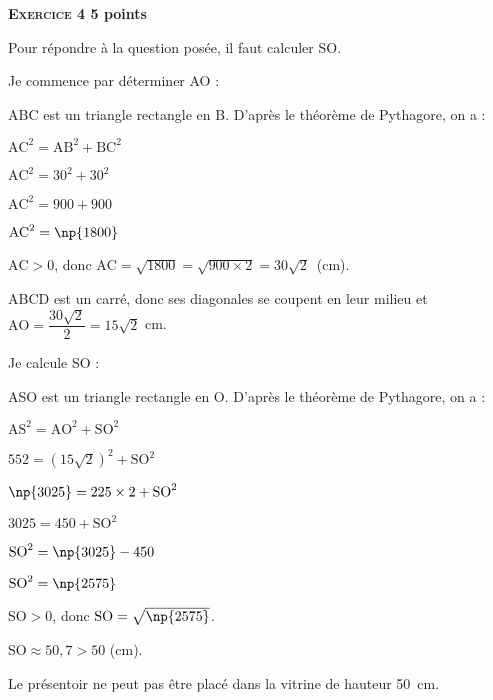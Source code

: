 \textbf{\textsc{Exercice 4} \hfill 5 points}

\medskip

Pour répondre à la question posée, il faut calculer SO.

Je commence par déterminer AO :

ABC est un triangle rectangle en B. D'après le théorème de Pythagore, on a :

$\text{AC}^2 = \text{AB}^2 + \text{BC}^2$

$\text{AC}^2 = 30^2 + 30^2$

$\text{AC}^2 = 900 + 900$

$\text{AC}^2 = \np{1800}$

$\text{AC} > 0$, donc $\text{AC} = \sqrt{1800} = \sqrt{900 \times 2} = 30\sqrt{2}$~(cm).

ABCD est un carré, donc ses diagonales se coupent en leur milieu et
$\text{AO} = \dfrac{30\sqrt{2}}{2} = 15\sqrt{2}$ cm.

Je calcule SO :

ASO est un triangle rectangle en O. D'après le théorème de Pythagore, on a :

$\text{AS}^2 = \text{AO}^2 + \text{SO}^2$

$552 = \left(15\sqrt{2}\right)^2 + \text{SO}^2$

$\np{3025} = 225 \times 2 + \text{SO}^2$

$3 025 = 450 + \text{SO}^2$

$\text{SO}^2 = \np{3025} - 450$

$\text{SO}^2 = \np{2575}$

$\text{SO} > 0$, donc $\text{SO} = \sqrt{\np{2575}}$.

$\text{SO} \approx  50,7> 50  $ (cm).

Le présentoir ne peut pas être placé dans la vitrine de hauteur 50~cm.

\vspace{0,5cm}

